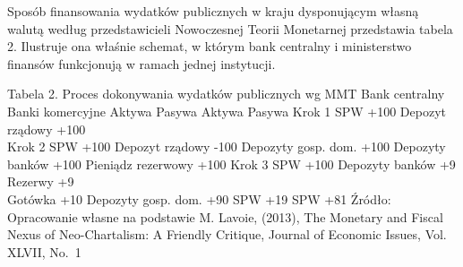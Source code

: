 \documentclass[
]{book}
\begin{document}
Sposób finansowania wydatków publicznych w kraju dysponującym własną walutą według przedstawicieli Nowoczesnej Teorii Monetarnej przedstawia tabela 2. Ilustruje ona właśnie schemat, w którym bank centralny i ministerstwo finansów funkcjonują w ramach jednej instytucji.

Tabela 2. Proces dokonywania wydatków publicznych wg MMT Bank centralny Banki komercyjne Aktywa Pasywa Aktywa Pasywa Krok 1 SPW +100 Depozyt rządowy +100\\
Krok 2 SPW +100 Depozyt rządowy -100 Depozyty gosp. dom. +100 Depozyty banków +100 Pieniądz rezerwowy +100 Krok 3 SPW +100 Depozyty banków +9 Rezerwy +9\\
Gotówka +10 Depozyty gosp. dom. +90 SPW +19 SPW +81 Źródło: Opracowanie własne na podstawie M. Lavoie, (2013), The Monetary and Fiscal Nexus of Neo-Chartalism: A Friendly Critique, Journal of Economic Issues, Vol. XLVII, No.~1
\end{document}
